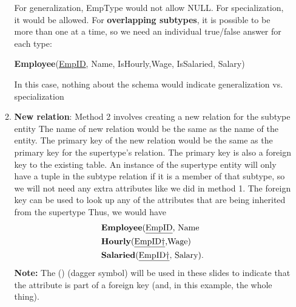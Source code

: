 \documentclass{report}
\begin{document}
\begin{itemize}
\begin{enumerate}
\begin{center}
                    \end{center}
                    \bigbreak \noindent 
                    For generalization, EmpType would not allow NULL. For specialization, it would be allowed.
                    \bigbreak \noindent 
                    For \textbf{overlapping subtypes}, it is possible to be more than one at a time, so we need an individual true/false answer for each type:
                    \bigbreak \noindent 
                    \begin{center}
                        \textbf{Employee}(\underline{EmpID}, Name, IsHourly,Wage, IsSalaried, Salary)
                    \end{center}
                    \bigbreak \noindent 
                    In this case, nothing about the schema would indicate generalization vs. specialization
                \item \textbf{New relation}: Method 2 involves creating a new relation for the subtype entity
                    The name of new relation would be the same as the name of the entity.
                    \bigbreak \noindent 
                    The primary key of the new relation would be the same as the primary key for the supertype's relation.
                    \bigbreak \noindent 
                    The primary key is also a foreign key to the existing table.
                    \bigbreak \noindent 
                    An instance of the supertype entity will only have a tuple in the subtype relation if it is a member of that subtype, so we will not need any extra attributes like we did in method 1.
                    \bigbreak \noindent 
                    The foreign key can be used to look up any of the attributes that are being inherited from the supertype
                    \bigbreak \noindent 
                    Thus, we would have 
                    \begin{align*}
                        &\text{\textbf{Employee}(\underline{EmpID}, Name} \\
                        &\text{\textbf{Hourly}(\underline{EmpID\dag},Wage)} \\
                        &\text{\textbf{Salaried}(\underline{EmpID\dag}, Salary)}
                    .\end{align*}
                    \bigbreak \noindent 
                    \textbf{Note:} The (\dag) (dagger symbol) will be used in these slides to indicate that the attribute is part of a foreign key (and, in this example, the whole thing).
            \end{enumerate}

\end{itemize}
\end{document}
